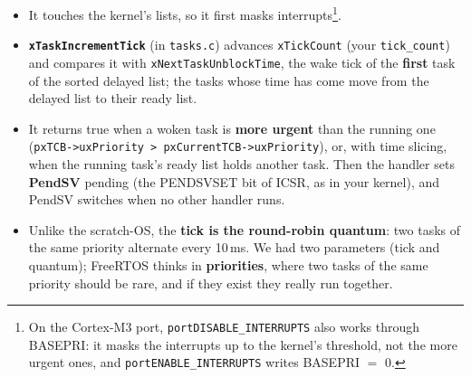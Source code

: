 \begin{itemize}
    \item It touches the kernel's lists, so it first masks interrupts\footnote{On the Cortex-M3 port, \texttt{portDISABLE\_INTERRUPTS} also works through BASEPRI: it masks the interrupts up to the kernel's threshold, not the more urgent ones, and \texttt{portENABLE\_INTERRUPTS} writes BASEPRI $=$ 0.}.
    \item \textbf{\texttt{xTaskIncrementTick}} (in \texttt{tasks.c}) advances \texttt{xTickCount} (your \texttt{tick\_count}) and compares it with \texttt{xNextTaskUnblockTime}, the wake tick of the \textbf{first} task of the sorted delayed list; the tasks whose time has come move from the delayed list to their ready list.
    \item It returns true when a woken task is \textbf{more urgent} than the running one (\texttt{pxTCB->uxPriority > pxCurrentTCB->uxPriority}), or, with time slicing, when the running task's ready list holds another task. Then the handler sets \textbf{PendSV} pending (the PENDSVSET bit of ICSR, as in your kernel), and PendSV switches when no other handler runs.
    \item Unlike the scratch-OS, the \textbf{tick is the round-robin quantum}: two tasks of the same priority alternate every 10\,ms. We had two parameters (tick and quantum); FreeRTOS thinks in \textbf{priorities}, where two tasks of the same priority should be rare, and if they exist they really run together.
\end{itemize}

